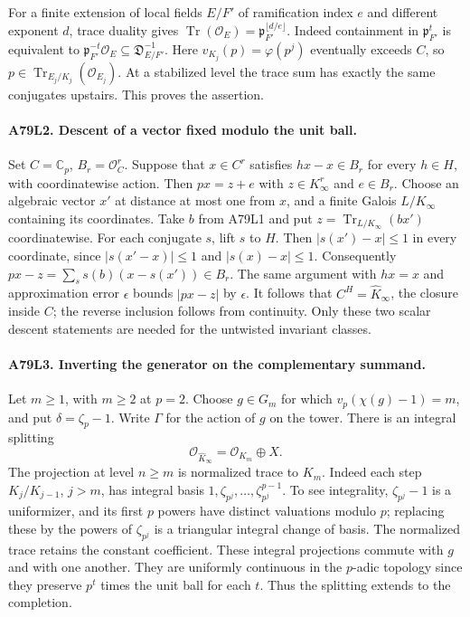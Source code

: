 For a finite extension of local fields $E/F'$ of ramification
index $e$ and different exponent $d$, trace duality gives
$\operatorname{Tr}(\mathcal O_E)=\mathfrak p_{F'}^{\lfloor d/e\rfloor}$.
Indeed containment in $\mathfrak p_{F'}^t$ is equivalent to
$\mathfrak p_{F'}^{-t}\mathcal O_E\subseteq\mathfrak D^{-1}_{E/F'}$.
Here $v_{K_j}(p)=\varphi(p^j)$ eventually exceeds $C$, so
$p\in\operatorname{Tr}_{E_j/K_j}(\mathcal O_{E_j})$. At a stabilized
level the trace sum has exactly the same conjugates upstairs.
This proves the assertion.

\paragraph{A79L2. Descent of a vector fixed modulo the unit ball.}
Set $C=\mathbb C_p$, $B_r=\mathcal O_C^r$. Suppose that
$x\in C^r$ satisfies $hx-x\in B_r$ for every $h\in H$, with
coordinatewise action. Then $px=z+e$ with $z\in K_\infty^r$
and $e\in B_r$. Choose an algebraic vector $x'$ at distance
at most one from $x$, and a finite Galois $L/K_\infty$ containing
its coordinates. Take $b$ from A79L1 and put
$z=\operatorname{Tr}_{L/K_\infty}(bx')$ coordinatewise. For each
conjugate $s$, lift $s$ to $H$. Then $|s(x')-x|\le1$ in every
coordinate, since $|s(x'-x)|\le1$ and $|s(x)-x|\le1$.
Consequently $px-z=\sum_s s(b)(x-s(x'))\in B_r$.
The same argument with $hx=x$ and approximation error $\epsilon$
bounds $|px-z|$ by $\epsilon$. It follows that
$C^H=\widehat K_\infty$, the closure inside $C$; the reverse inclusion
follows from continuity. Only these two scalar descent statements
are needed for the untwisted invariant classes.

\paragraph{A79L3. Inverting the generator on the complementary summand.}
Let $m\ge1$, with $m\ge2$ at $p=2$. Choose $g\in G_m$ for
which $v_p(\chi(g)-1)=m$, and put $\delta=\zeta_p-1$.
Write $\Gamma$ for the action of $g$ on the tower. There is an integral
splitting
\[
 \mathcal O_{\widehat K_\infty}=\mathcal O_{K_m}\oplus X .
\]
The projection at level $n\ge m$ is normalized trace to $K_m$.
Indeed each step $K_j/K_{j-1}$, $j>m$, has integral basis
$1,\zeta_{p^j},\ldots,\zeta_{p^j}^{p-1}$. To see integrality,
$\zeta_{p^j}-1$ is a uniformizer, and its first $p$ powers have distinct
valuations modulo $p$; replacing these by the powers of $\zeta_{p^j}$
is a triangular integral change of basis. The normalized trace
retains the constant coefficient. These integral projections commute
with $g$ and with one another. They are uniformly continuous in the
$p$-adic topology since they preserve $p^t$ times the unit ball for
each $t$. Thus the splitting extends to the completion.

